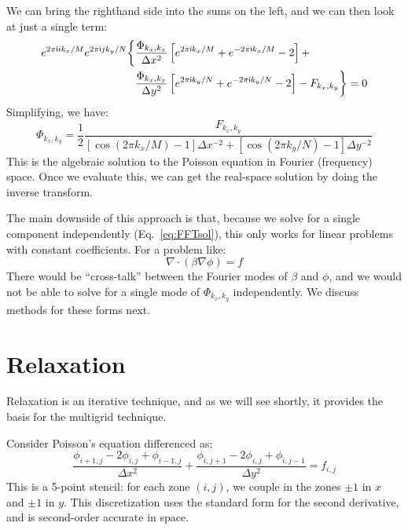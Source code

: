We can bring the righthand side into the sums on the left, and we can
then look at just a single term:
\begin{align}
  e^{2\pi\mathsf{i} i k_x/M} e^{2\pi\mathsf{i} j k_y/N}
  \biggl \{
  &\frac{\Phi_{k_x,k_x}}{\Delta x^2}
  \left [e^{2\pi\mathsf{i} k_x/M} + e^{-2\pi\mathsf{i} k_x/M} - 2 \right ] + \nonumber \\
  &\frac{\Phi_{k_x,k_x}}{\Delta y^2}
  \left [e^{2\pi\mathsf{i} k_y/N} + e^{-2\pi\mathsf{i} k_y/N} - 2 \right ] 
  - F_{k_x,k_y}
  \biggr \} = 0
\end{align}
Simplifying, we have:
\begin{equation}
  \Phi_{k_x,k_y} = \frac{1}{2}\frac{F_{k_x,k_y}}
      {\left [\cos(2\pi k_x/M) - 1 \right ] \Delta x^{-2} +
        \left [\cos(2\pi k_y/N) - 1 \right ] \Delta y^{-2}}
      \label{eq:FFTsol}
\end{equation}
This is the algebraic solution to the Poisson equation in Fourier (frequency)
space.  Once we evaluate this, we can get the real-space solution
by doing the inverse transform.

The main downside of this approach is that, because we solve for a
single component independently (Eq.~\ref{eq:FFTsol}), this only
works for linear problems with constant coefficients.  For a problem
like:
\begin{equation}
  \nabla \cdot (\beta \nabla \phi) = f
\end{equation}
There would be ``cross-talk'' between the Fourier modes of $\beta$
and $\phi$, and we would not be able to solve for a single mode
of $\Phi_{k_x,k_y}$ independently.  We discuss methods for these
forms next.

\section{Relaxation}

Relaxation is an iterative technique, and as we will see shortly, it
provides the basis for the multigrid technique.  

Consider Poisson's equation differenced as:
\begin{equation}
\frac{\phi_{i+1,j} - 2 \phi_{i,j} + \phi_{i-1,j}}{\Delta x^2} +
\frac{\phi_{i,j+1} - 2 \phi_{i,j} + \phi_{i,j-1}}{\Delta y^2} = f_{i,j}
\end{equation}
This is a 5-point stencil: for each zone $(i,j)$, we couple in the
zones $\pm 1$ in $x$ and $\pm 1$ in $y$.  This discretization uses
the standard form for the second derivative, and is second-order
accurate in space.  

